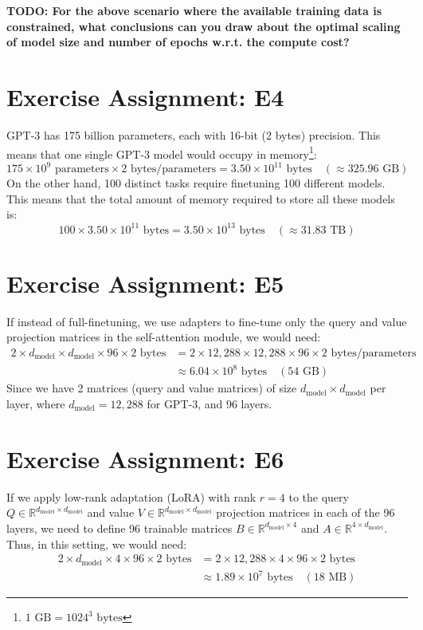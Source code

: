 \documentclass{article}
\begin{document}
\textbf{TODO: For the above scenario where the available training data is constrained, what conclusions can you draw about the optimal scaling of model size and number of epochs w.r.t. the compute cost?}

\section{Exercise Assignment: E4}\label{sec:e4}
GPT-3 has 175 billion parameters, each with 16-bit (2 bytes) precision. This means that one single GPT-3 model would occupy in memory\footnote{$1 \text{ GB} = 1024^3 \text{ bytes}$}:
\[
    175 \times 10^9 \text{ parameters} \times 2 \text{ bytes}/\text{parameters} = 3.50 \times 10^{11} \text{ bytes} \quad (\approx 325.96 \text{ GB})
\]
On the other hand, 100 distinct tasks require finetuning 100 different models. This means that the total amount of memory required to store all these models is:
\[
    100 \times 3.50 \times 10^{11} \text{ bytes} = 3.50 \times 10^{13} \text{ bytes} \quad (\approx 31.83 \text{ TB})
\]

\section{Exercise Assignment: E5}\label{sec:e5}
If instead of full-finetuning, we use adapters to fine-tune only the query
and value projection matrices in the self-attention module, we would need:
\begin{align*}
    2 \times d_{\text{model}} \times d_{\text{model}} \times 96 \times 2 \text{ bytes} & = 2 \times 12{,}288 \times 12{,}288 \times 96 \times 2 \text{ bytes}/\text{parameters} \\ &\approx 6.04 \times 10^8 \text{ bytes} \quad (54 \text{ GB})
\end{align*}
Since we have 2 matrices (query and value matrices) of size $d_{\text{model}} \times d_{\text{model}}$ per layer, where $d_{\text{model}} = 12{,}288$ for GPT-3, and 96 layers.

\section{Exercise Assignment: E6}\label{sec:e6}
If we apply low-rank adaptation (LoRA) with rank $r=4$ to the query $Q \in \mathbb{R}^{d_{\text{model}} \times d_{\text{model}}}$ and value $V \in \mathbb{R}^{d_{\text{model}} \times d_{\text{model}}}$ projection matrices in each of the 96 layers, we need to define 96 trainable matrices $B \in \mathbb{R}^{d_{\text{model}} \times 4}$ and $A \in \mathbb{R}^{4 \times d_{\text{model}}}$. Thus, in this setting, we would need:
\begin{align*}
    2 \times d_{\text{model}} \times 4 \times 96 \times 2 \text{ bytes} & = 2 \times 12{,}288 \times 4 \times 96 \times 2 \text{ bytes} \\ &\approx 1.89 \times 10^7 \text{ bytes} \quad (18 \text{ MB})
\end{align*}
\end{document}
